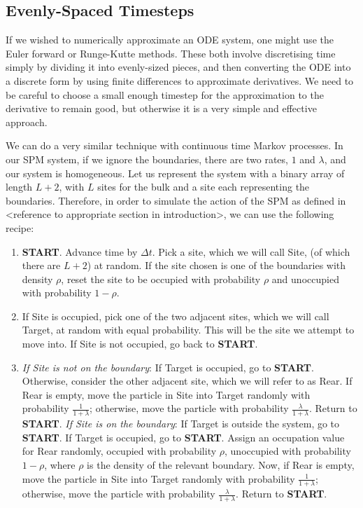 \subsection{Evenly-Spaced Timesteps} \label{sec:evenTimesteps}

If we wished to numerically approximate an ODE system, one might use the Euler forward or 
Runge-Kutte methods. These both involve discretising time simply by dividing it into evenly-sized
pieces, and then converting the ODE into a discrete form by using finite differences to
approximate derivatives. We need to be careful to choose a small enough timestep for
the approximation to the derivative to remain good, but otherwise it is a very simple and 
effective approach.

We can do a very similar technique with continuous time Markov processes. In our SPM system,
if we ignore the boundaries, there are two rates, $1$ and $\lambda$, and our system is 
homogeneous. Let us represent the system with a binary array of length $L+2$, with $L$ sites for the bulk
and a site each representing the boundaries. Therefore, in order to simulate the action of the SPM as
defined in <reference to appropriate section in
introduction>, we can use the following recipe:
\begin{enumerate}
 \item \textbf{START}. Advance time by $\Delta t$. Pick a site, which we will call
 Site,
 (of which there are $L+2$) at random. If the site chosen is one of the boundaries with density $\rho$,
 reset the site to be occupied with probability $\rho$ and unoccupied with probability $1-\rho$.
 \item If Site is occupied, pick one of the two adjacent sites, which we will call Target, at random with equal probability.
 This will be the site we attempt to move into. If Site is not occupied, go back to \textbf{START}.
 \item \textit{If Site is not on the boundary}: If Target is occupied, go to \textbf{START}. Otherwise, consider the other adjacent site,
 which we will refer to as Rear. If Rear is empty, move the particle in Site into Target 
 randomly with
 probability $\frac{1}{1+\lambda}$; otherwise, move the particle with probability
 $\frac{\lambda}{1+\lambda}$. Return to \textbf{START}. 
 \newline \textit{If Site is on the boundary}: If Target is outside the system, go to \textbf{START}.
 If Target is occupied, go to \textbf{START}. Assign an occupation value for Rear randomly, occupied
 with probability $\rho$, unoccupied with probability $1-\rho$, where $\rho$ is the density of the relevant
 boundary. Now, if Rear is empty, move the particle in Site into Target 
 randomly with  probability $\frac{1}{1+\lambda}$; otherwise, move the particle with probability
 $\frac{\lambda}{1+\lambda}$. Return to \textbf{START}.
\end{enumerate}

